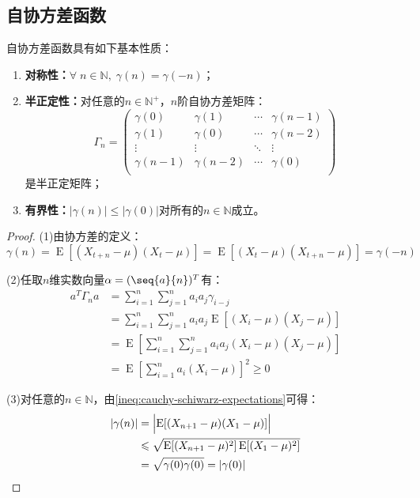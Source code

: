 \subsection{自协方差函数}
\begin{property}
	自协方差函数具有如下基本性质：
	\begin{enumerate}
		\item \textbf{对称性：}$\forall\;n\in\mathbb{N},\;\gamma(n)=\gamma(-n)$；
		\item \textbf{半正定性：}对任意的$n\in\mathbb{N}^+$，$n$阶自协方差矩阵：
		\begin{equation*}
			\Gamma_n=
			\begin{pmatrix}
				\gamma(0) & \gamma(1) & \cdots & \gamma(n-1) \\
				\gamma(1) & \gamma(0) & \cdots & \gamma(n-2) \\
				\vdots & \vdots & \ddots & \vdots \\
				\gamma(n-1) & \gamma(n-2) & \cdots & \gamma(0) \\
			\end{pmatrix}
		\end{equation*}
		是半正定矩阵；
		\item \textbf{有界性：}$|\gamma(n)|\leqslant|\gamma(0)|$对所有的$n\in\mathbb{N}$成立。
	\end{enumerate}
\end{property}
\begin{proof}
	(1)由协方差的定义：
	\begin{equation*}
		\gamma(n)=\operatorname{E}[(X_{t+n}-\mu)(X_t-\mu)]=\operatorname{E}[(X_t-\mu)(X_{t+n}-\mu)]=\gamma(-n)
	\end{equation*}\par
	(2)任取$n$维实数向量$\alpha=(\seq{a}{n})^T$有：
	\begin{align*}
		a^T\Gamma_na
		&=\sum_{i=1}^{n}\sum_{j=1}^{n}a_ia_j\gamma_{i-j} \\
		&=\sum_{i=1}^{n}\sum_{j=1}^{n}a_ia_j\operatorname{E}[(X_i-\mu)(X_j-\mu)]\\
		&=\operatorname{E}\left[\sum_{i=1}^{n}\sum_{j=1}^{n}a_ia_j(X_i-\mu)(X_j-\mu)\right] \\
		&=\operatorname{E}\left[\sum_{i=1}^{n}a_i(X_i-\mu)\right]^2\geqslant0
	\end{align*}\par
	(3)对任意的$n\in \mathbb{N}$，由\cref{ineq:cauchy-schiwarz-expectations}可得：
	\begin{align*}
		|\gamma(n)|
		&=\Bigl|\operatorname{E}[(X_{n+1}-\mu)(X_1-\mu)]\Bigr| \\
		&\leqslant\sqrt{\operatorname{E}[(X_{n+1}-\mu)^2]\operatorname{E}[(X_1-\mu)^2]} \\
		&=\sqrt{\gamma(0)\gamma(0)}=|\gamma(0)|\qedhere
	\end{align*}
\end{proof}
